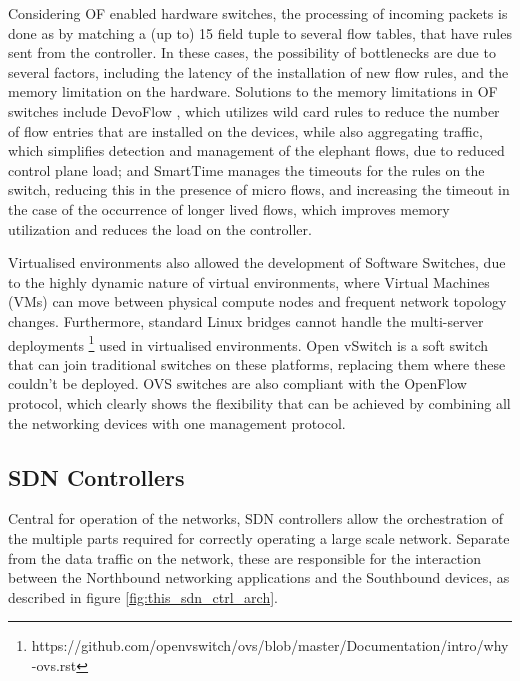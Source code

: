 \begin {enumerate}
\begin{enumerate}
\par Considering OF enabled hardware switches, the processing of incoming packets is done as by matching a (up to) 15 field tuple \cite{raz_2014_2014} to several 
flow tables, that have rules sent from the controller. In these cases, the possibility of bottlenecks are due to several factors, including the latency
of the installation of new flow rules, and the memory limitation on the hardware. Solutions to the memory limitations in OF switches include DevoFlow 
\cite{nunes_survey_2014}, which utilizes wild card rules to reduce the number of flow entries that are installed on the devices, while also aggregating 
traffic, which simplifies detection and management of the elephant flows, due to reduced control plane load; and SmartTime
\cite{vishnoi_effective_2014} manages the timeouts for the rules on the switch, reducing this in the presence of micro flows, and increasing the timeout
in the case of the occurrence of longer lived flows, which improves memory utilization and reduces the load on the controller.

\par Virtualised environments also allowed the development of Software Switches, due to the highly dynamic nature of virtual environments, where Virtual Machines
(VMs) can move between physical compute nodes and frequent network topology changes. Furthermore, standard Linux bridges cannot handle the multi-server
deployments \footnote {https://github.com/openvswitch/ovs/blob/master/Documentation/intro/why-ovs.rst} used in virtualised environments. Open vSwitch is a
soft switch that can join traditional switches on these platforms, replacing them where these couldn't be deployed. OVS switches are also
compliant with the OpenFlow protocol, which clearly shows the flexibility that can be achieved by combining all the networking devices with one management 
protocol. 

\subsection {SDN Controllers}

Central for operation of the networks, SDN controllers allow the orchestration of the multiple parts required for correctly operating a large scale network.
Separate from the data traffic on the network, these are responsible for the interaction between the Northbound networking applications and the Southbound
devices, as described in figure \ref{fig:this_sdn_ctrl_arch}.


\end{enumerate}
\end{enumerate}
